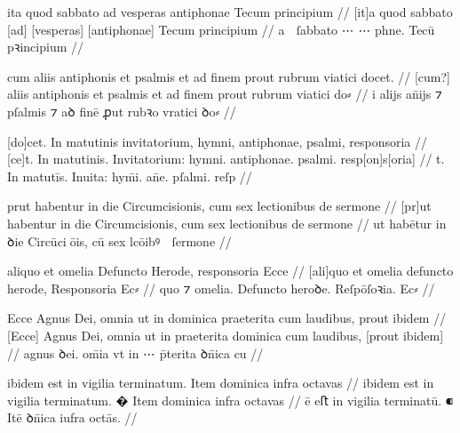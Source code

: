 \ex \bg
\gla
{}
ita quod sabbato ad vesperas antiphonae Tecum principium
//
\glRekonstrukcja
{}
[it]a quod sabbato [ad] [vesperas] [antiphonae] Tecum principium
//
\glU
{}
a  ſabbato ⋯ ⋯ phne. Tecū pꝛincipium
//
\endgl
\xe



\ex \bg
\gla
{}
cum aliis antiphonis et psalmis et ad finem prout rubrum viatici docet. 
//
\glRekonstrukcja
{}
[cum?] aliis antiphonis et psalmis et ad finem prout rubrum viatici do⸗ 
//
\glU
{}
i alijs an̄ijs ⁊ pſalmis ⁊ aꝺ finē ꝓut rubꝛo vratici ꝺo⸗ 
//
\endgl
\xe



\ex \bg
\gla
{}
[do]cet. In matutinis invitatorium, hymni, antiphonae, psalmi, responsoria
//
\glRekonstrukcja
{}
[ce]t. In matutinis. Invitatorium: hymni. antiphonae. psalmi. resp[on]s[oria] 
//
\glU
{}
t. In matutīs. Inuita: hym̄i. an̄e. pſalmi. reſp
//
\endgl
\xe



\ex \bg
\gla
{}
prut habentur in die Circumcisionis, cum sex lectionibus de sermone
//
\glRekonstrukcja
{}
[pr]ut habentur in die Circumcisionis, cum sex lectionibus de sermone
//
\glU
{}
ut habētur in ꝺie Circūciōis, cū sex lcōibꝰ  ſermone
//
\endgl
\xe

\ex \bg
\gla
{}
aliquo et
omelia Defuncto Herode, responsoria Ecce
//
\glRekonstrukcja
{}
[ali]quo et
omelia defuncto herode, Responsoria Ec⸗
//
\glU
{}
quo ⁊ omelia. Defuncto heroꝺe. Reſpōſoꝛia. Ec⸗
//
\endgl
\xe




\ex \bg
\gla
{}
Ecce Agnus Dei, omnia ut in dominica praeterita {} cum laudibus, prout ibidem
//
\glRekonstrukcja
{}
[Ecce] Agnus Dei, omnia ut in {} praeterita dominica cum laudibus, [prout ibidem]
//
\glU
{}
 agnus ꝺei. om̄ia vt in ⋯ p̄terita ꝺn̄ica cu   
//
\endgl
\xe



\ex \bg
\gla
{}
ibidem est in vigilia terminatum.
{} Item dominica infra octavas
//
\glRekonstrukcja
{}
ibidem est in vigilia terminatum.
� Item dominica infra octavas
//
\glU
{}
ē eﬅ in vigilia terminatū. ⁌ Itē ꝺn̄ica iufra octās.
//
\endgl
\xe



